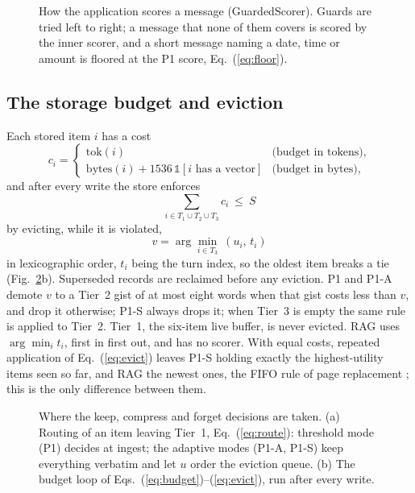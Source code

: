 \begin{figure}[htbp]
\centering
{}
\caption[How the application scores a message (GuardedScorer).]{How the application scores a message (GuardedScorer). Guards are
tried left to right; a message that none of them covers is scored by the
inner scorer, and a short message naming a date, time or amount is floored at
the P1 score, Eq.~(\ref{eq:floor}).}
\label{fig:scoring}
\end{figure}

\subsection{The storage budget and eviction}
Each stored item $i$ has a cost
\begin{equation}
\label{eq:cost}
c_i=\begin{cases}
\mathrm{tok}(i) & \text{(budget in tokens)},\\
\mathrm{bytes}(i)+1536\,\mathbb{1}[i \text{ has a vector}] & \text{(budget in bytes)},
\end{cases}
\end{equation}
and after every write the store enforces
\begin{equation}
\label{eq:budget}
\sum_{i\in T_1\cup T_2\cup T_3} c_i\ \le\ S
\end{equation}
by evicting, while it is violated,
\begin{equation}
\label{eq:evict}
v=\arg\min_{i\in T_3}\ (u_i,\,t_i)
\end{equation}
in lexicographic order, $t_i$ being the turn index, so the oldest item breaks
a tie (Fig.~\ref{fig:routing}b). Superseded records are reclaimed before any
eviction. P1 and P1-A demote $v$ to a Tier~2 gist of at most eight words when
that gist costs less than $v$, and drop it otherwise; P1-S always drops it;
when Tier~3 is empty the same rule is applied to Tier~2. Tier~1, the six-item
live buffer, is never evicted. RAG uses $\arg\min_i t_i$, first in first out,
and has no scorer. With equal costs, repeated application of
Eq.~(\ref{eq:evict}) leaves P1-S holding exactly the highest-utility items
seen so far, and RAG the newest ones, the FIFO rule of page replacement
\cite{belady1966replacement}; this is the only difference between them.

\begin{figure}[htbp]
\centering
\resizebox{0.95\textwidth}{!}{}
\caption[Where the keep, compress and forget decisions are taken.]{Where the keep, compress and forget decisions are taken. (a) Routing
of an item leaving Tier~1, Eq.~(\ref{eq:route}): threshold mode (P1) decides
at ingest; the adaptive modes (P1-A, P1-S) keep everything verbatim and let
$u$ order the eviction queue. (b) The budget loop of
Eqs.~(\ref{eq:budget})--(\ref{eq:evict}), run after every write.}
\label{fig:routing}
\end{figure}


